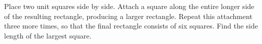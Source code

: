 Place two unit squares side by side. Attach a square along the entire longer side of the resulting rectangle, producing a larger rectangle. Repeat this attachment three more times, so that the final rectangle consists of six squares. Find the side length of the largest square.

